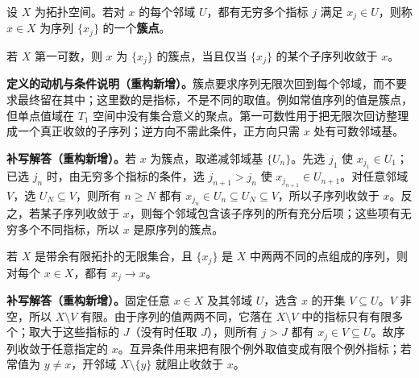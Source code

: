 \documentclass[../../main.tex]{subfiles}%
\begin{document}
\begin{exercise}\label{exercise:ch04-sequence-cluster-subsequence}
\begin{definition*}[序列的簇点]\label{definition:ch04-sequence-cluster-point}
设 $X$ 为拓扑空间。若对 $x$ 的每个邻域 $U$，都有无穷多个指标 $j$ 满足 $x_j\in U$，则称 $x\in X$ 为序列 $\{x_j\}$ 的一个\textbf{簇点}。
\end{definition*}
若 $X$ 第一可数，则 $x$ 为 $\{x_j\}$ 的簇点，当且仅当 $\{x_j\}$ 的某个子序列收敛于 $x$。
\end{exercise}
\begin{remark}
\textbf{定义的动机与条件说明（重构新增）。}簇点要求序列无限次回到每个邻域，而不要求最终留在其中；这里数的是指标，不是不同的取值。例如常值序列的值是簇点，但单点值域在 $T_1$ 空间中没有集合意义的聚点。第一可数性用于把无限次回访整理成一个真正收敛的子序列；逆方向不需此条件，正方向只需 $x$ 处有可数邻域基。
\end{remark}
\begin{solution}
\textbf{补写解答（重构新增）。}若 $x$ 为簇点，取递减邻域基 $\{U_n\}$。先选 $j_1$ 使 $x_{j_1}\in U_1$；已选 $j_n$ 时，由无穷多个指标的条件，选 $j_{n+1}>j_n$ 使 $x_{j_{n+1}}\in U_{n+1}$。对任意邻域 $V$，选 $U_N\subseteq V$，则所有 $n\ge N$ 都有 $x_{j_n}\in U_n\subseteq U_N\subseteq V$，所以子序列收敛于 $x$。反之，若某子序列收敛于 $x$，则每个邻域包含该子序列的所有充分后项；这些项有无穷多个不同指标，所以 $x$ 是原序列的簇点。
\end{solution}
\begin{exercise}\label{exercise:ch04-cofinite-sequence}
若 $X$ 是带余有限拓扑的无限集合，且 $\{x_j\}$ 是 $X$ 中两两不同的点组成的序列，则对每个 $x\in X$，都有 $x_j\to x$。
\end{exercise}
\begin{solution}
\textbf{补写解答（重构新增）。}固定任意 $x\in X$ 及其邻域 $U$，选含 $x$ 的开集 $V\subseteq U$。$V$ 非空，所以 $X\setminus V$ 有限。由于序列的值两两不同，它落在 $X\setminus V$ 中的指标只有有限多个；取大于这些指标的 $J$（没有时任取 $J$），则所有 $j>J$ 都有 $x_j\in V\subseteq U$。故序列收敛于任意指定的 $x$。互异条件用来把有限个例外取值变成有限个例外指标；若常值为 $y\ne x$，开邻域 $X\setminus\{y\}$ 就阻止收敛于 $x$。
\end{solution}
\end{document}
